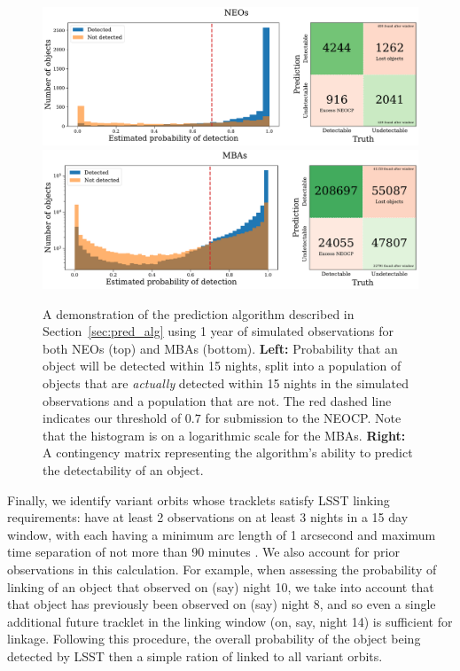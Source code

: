 \documentclass[twocolumn]{aastex631}
\newcommand{\thresholdAlg}{0.7}
\begin{document}
\begin{figure}[htb]
    \centering
    \includegraphics[width=\textwidth]{contingency_neo.pdf}
    \includegraphics[width=\textwidth]{contingency_mba.pdf}
    \caption{A demonstration of the prediction algorithm described in Section~\ref{sec:pred_alg} using 1 year of simulated observations for both NEOs (top) and MBAs (bottom). \textbf{Left:} Probability that an object will be detected within 15 nights, split into a population of objects that are \textit{actually} detected within 15 nights in the simulated observations and a population that are not. The red dashed line indicates our threshold of $\thresholdAlg{}$ for submission to the NEOCP. Note that the histogram is on a logarithmic scale for the MBAs. \textbf{Right:} A contingency matrix representing the algorithm's ability to predict the detectability of an object.}
    \label{fig:contingency}
\end{figure}

Finally, we identify variant orbits whose tracklets satisfy LSST linking requirements: have at least 2 observations on at least 3 nights in a 15 day window, with each having a minimum arc length of 1 arcsecond and maximum time separation of not more than 90 minutes \citep{oss}. We also account for prior observations in this calculation. For example, when assessing the probability of linking of an object that observed on (say) night 10, we take into account that that object has previously been observed on (say) night 8, and so even a single additional future tracklet in the linking window (on, say, night 14) is sufficient for linkage. Following this procedure, the overall probability of the object being detected by LSST then a simple ration of linked to all variant orbits.
\end{document}
